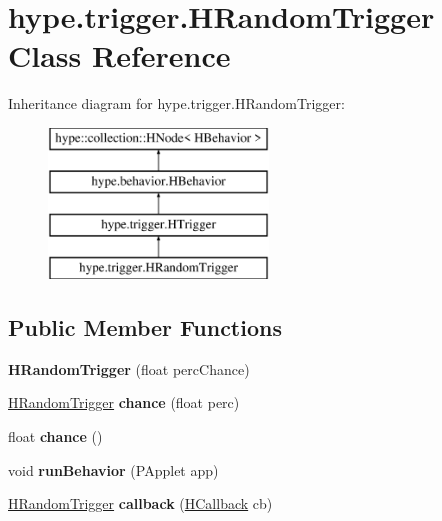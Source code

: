 \hypertarget{classhype_1_1trigger_1_1_h_random_trigger}{\section{hype.\-trigger.\-H\-Random\-Trigger Class Reference}
\label{classhype_1_1trigger_1_1_h_random_trigger}
}
Inheritance diagram for hype.\-trigger.\-H\-Random\-Trigger\-:\begin{figure}[H]
\begin{center}
\leavevmode
\includegraphics[height=4.000000cm]{classhype_1_1trigger_1_1_h_random_trigger}
\end{center}
\end{figure}
\subsection*{Public Member Functions}
\begin{DoxyCompactItemize}
\item 
\hypertarget{classhype_1_1trigger_1_1_h_random_trigger_acb6611efb7275920a232ea3d79273d75}{{\bfseries H\-Random\-Trigger} (float perc\-Chance)}\label{classhype_1_1trigger_1_1_h_random_trigger_acb6611efb7275920a232ea3d79273d75}

\item 
\hypertarget{classhype_1_1trigger_1_1_h_random_trigger_a06de82722bf8de5c47dfa14f7883ac5d}{\hyperlink{classhype_1_1trigger_1_1_h_random_trigger}{H\-Random\-Trigger} {\bfseries chance} (float perc)}\label{classhype_1_1trigger_1_1_h_random_trigger_a06de82722bf8de5c47dfa14f7883ac5d}

\item 
\hypertarget{classhype_1_1trigger_1_1_h_random_trigger_a32a9dc31869457b4eab4310c5fbc4fbc}{float {\bfseries chance} ()}\label{classhype_1_1trigger_1_1_h_random_trigger_a32a9dc31869457b4eab4310c5fbc4fbc}

\item 
\hypertarget{classhype_1_1trigger_1_1_h_random_trigger_a449344804ddd737ccd51da251ef156ca}{void {\bfseries run\-Behavior} (P\-Applet app)}\label{classhype_1_1trigger_1_1_h_random_trigger_a449344804ddd737ccd51da251ef156ca}

\item 
\hypertarget{classhype_1_1trigger_1_1_h_random_trigger_aa2d51be660dca443e09a2bcc0c128231}{\hyperlink{classhype_1_1trigger_1_1_h_random_trigger}{H\-Random\-Trigger} {\bfseries callback} (\hyperlink{interfacehype_1_1interfaces_1_1_h_callback}{H\-Callback} cb)}\label{classhype_1_1trigger_1_1_h_random_trigger_aa2d51be660dca443e09a2bcc0c128231}

\end{DoxyCompactItemize}
